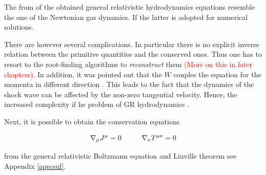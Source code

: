 \documentclass[11pt,a4paper,headinclude=true,DIV=14,BCOR=8mm,chapterprefix,listof=totoc,twoside,openright,abstracton]{scrbook}
\newcommand{\red}[1]{\textcolor{red}{#1}}
\begin{document}
The from of the obtained general relativistic hydrodynamics equations resemble the one of the Newtonian gas dynamics. If the latter is adopted for numerical solutions. 

There are however several complications. In particular there is no explicit inverse relation between the primitive quantities and the conserved ones. Thus one has to resort to the root-finding algorithms to \textit{reconstruct} them \red{(More on this in later chapters)}. In addition, it was pointed out that the $W$ couples the equation for the momenta in different direction \cite{Pons:2000,Rezzolla:2002ra,Rezzolla:2002cc,Aloy:2006rd}. This leads to the fact that the dynamics of the shock wave can be affected by the non-zero tangential velocity. Hence, the increased complexity if he problem of GR hydrodynamics \cite{Mignone:2005ns,Zhang:2005qy}.


Next, it is possible to obtain the conservation equations 

\begin{equation}
\nabla_{\mu}J^{\mu} =0 \hspace{10mm}\nabla_{\nu}T^{\mu\nu} =0
\end{equation}

from the general relativistic Boltzmann equation and Liuville theorem
see Appendix \ref{app:eul}.


\end{document}
